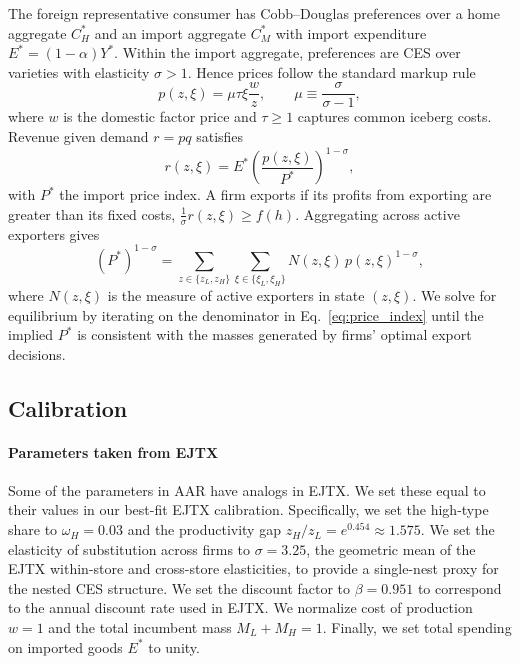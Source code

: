 \documentclass[12pt]{article} \usepackage{amsmath,amssymb,amsthm,geometry,graphicx,setspace,algorithm,algpseudocode,float}
\begin{document}
The foreign representative consumer has Cobb--Douglas preferences over a home aggregate $C_H^*$ and an import aggregate $C_M^*$ with import expenditure $E^*=(1-\alpha)Y^*$. Within the import aggregate, preferences are CES over varieties with elasticity $\sigma>1$. Hence prices follow the standard markup rule \begin{equation}
p(z,\xi)=\mu\tau\xi\frac{w}{z}, \qquad \mu \equiv \frac{\sigma}{\sigma-1},
\label{eq:price}
\end{equation}
where $w$ is the domestic factor price and $\tau\ge 1$ captures common iceberg costs. Revenue given demand $r=pq$ satisfies
\begin{equation} 
r(z,\xi)=E^*\left(\frac{p(z,\xi)}{P^*}\right)^{1-\sigma},
\label{eq:revenue}
\end{equation}
with $P^*$ the import price index. A firm exports if its profits from exporting are greater than its fixed costs, $\frac{1}{\sigma} r(z,\xi) \geq f(h)$.  Aggregating across active exporters gives
\begin{equation}
(P^*)^{1-\sigma}=\sum_{z\in\{z_L,z_H\}}\sum_{\xi\in\{\xi_L,\xi_H\}}
N(z,\xi)\,p(z,\xi)^{1-\sigma},
\label{eq:price_index}
\end{equation}
where $N(z,\xi)$ is the measure of active exporters in state $(z,\xi)$. We solve for equilibrium by iterating on the denominator in Eq.~\eqref{eq:price_index} until the implied $P^*$ is consistent with the
masses generated by firms’ optimal export decisions.

\subsection{Calibration}
\paragraph{Parameters taken from EJTX} Some of the parameters in AAR have analogs in EJTX. We set these equal to their values in our best-fit EJTX calibration. Specifically, we set the high-type share to $\omega_H = 0.03$ and the productivity gap $z_H/z_L = e^{0.454} \approx 1.575$. We set the elasticity of substitution across firms to $\sigma = 3.25$, the geometric mean of the EJTX within-store and cross-store elasticities, to provide a single-nest proxy for the nested CES structure.  We set the discount factor to $\beta = 0.951$ to correspond to the annual discount rate used in EJTX.  We normalize cost of production $w=1$ and the total incumbent mass \(M_L + M_H = 1\). Finally, we set total spending on imported goods $E^\ast$ to unity.
\end{document}
